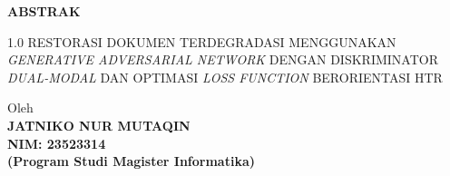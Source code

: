 

% 

\thispagestyle{plain} %

\begin{center}
    \textbf{ABSTRAK} \\
    \vspace{1em} %
    
    \begingroup
    \fontsize{14pt}{16.8pt}\selectfont %
    \bfseries %
    \begin{spacing}{1.0} %
        \MakeUppercase{Restorasi Dokumen Terdegradasi Menggunakan \textit{Generative Adversarial Network} dengan Diskriminator \textit{Dual-Modal} dan Optimasi \textit{Loss Function} Berorientasi HTR}
    \end{spacing}
    \endgroup

    \vspace{1cm} %

    Oleh\\
    \textbf{JATNIKO NUR MUTAQIN}\\
    \textbf{NIM: 23523314}\\
    \textbf{(Program Studi Magister Informatika)}
\end{center}

\vspace{3\baselineskip} 

